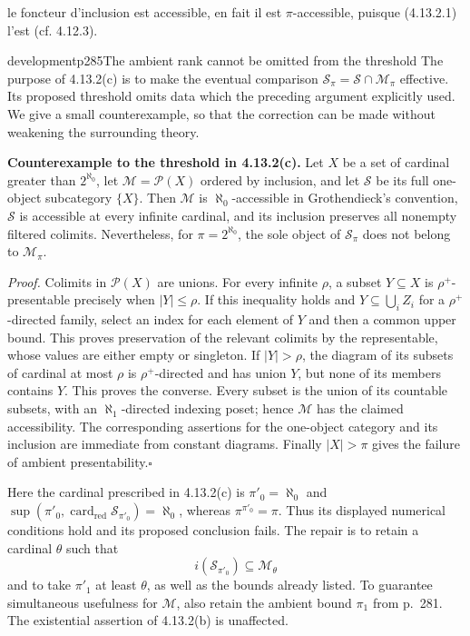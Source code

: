  le foncteur d'inclusion est accessible, en fait il est $\pi$-accessible, puisque (4.13.2.1) l'est (cf. 4.12.3).

\begin{dcomment}{development}{p285}{The ambient rank cannot be omitted from the threshold}
The purpose of 4.13.2(c) is to make the eventual comparison $\mathcal S_\pi=\mathcal S\cap\mathcal M_\pi$ effective. Its proposed threshold omits data which the preceding argument explicitly used. We give a small counterexample, so that the correction can be made without weakening the surrounding theory.

\textbf{Counterexample to the threshold in 4.13.2(c).}\ours
Let $X$ be a set of cardinal greater than $2^{\aleph_0}$, let $\mathcal M=\mathcal P(X)$ ordered by inclusion, and let $\mathcal S$ be its full one-object subcategory $\{X\}$. Then $\mathcal M$ is $\aleph_0$-accessible in Grothendieck's convention, $\mathcal S$ is accessible at every infinite cardinal, and its inclusion preserves all nonempty filtered colimits. Nevertheless, for $\pi=2^{\aleph_0}$, the sole object of $\mathcal S_\pi$ does not belong to $\mathcal M_\pi$.

\textit{Proof.} Colimits in $\mathcal P(X)$ are unions. For every infinite $\rho$, a subset $Y\subseteq X$ is $\rho^+$-presentable precisely when $|Y|\leq\rho$. If this inequality holds and $Y\subseteq\bigcup_i Z_i$ for a $\rho^+$-directed family, select an index for each element of $Y$ and then a common upper bound. This proves preservation of the relevant colimits by the representable, whose values are either empty or singleton. If $|Y|>\rho$, the diagram of its subsets of cardinal at most $\rho$ is $\rho^+$-directed and has union $Y$, but none of its members contains $Y$. This proves the converse. Every subset is the union of its countable subsets, with an $\aleph_1$-directed indexing poset; hence $\mathcal M$ has the claimed accessibility. The corresponding assertions for the one-object category and its inclusion are immediate from constant diagrams. Finally $|X|>\pi$ gives the failure of ambient presentability.\hfill$\square$

Here the cardinal prescribed in 4.13.2(c) is $\pi'_0=\aleph_0$ and $\sup(\pi'_0,\operatorname{card}_{\mathrm{red}}\mathcal S_{\pi'_0})=\aleph_0$, whereas $\pi^{\pi'_0}=\pi$. Thus its displayed numerical conditions hold and its proposed conclusion fails. The repair is to retain a cardinal $\theta$ such that
\[
 i(\mathcal S_{\pi'_0})\subseteq\mathcal M_\theta
\]
and to take $\pi'_1$ at least $\theta$, as well as the bounds already listed. To guarantee simultaneous usefulness for $\mathcal M$, also retain the ambient bound $\pi_1$ from p.~281. The existential assertion of 4.13.2(b) is unaffected.


\end{dcomment}
